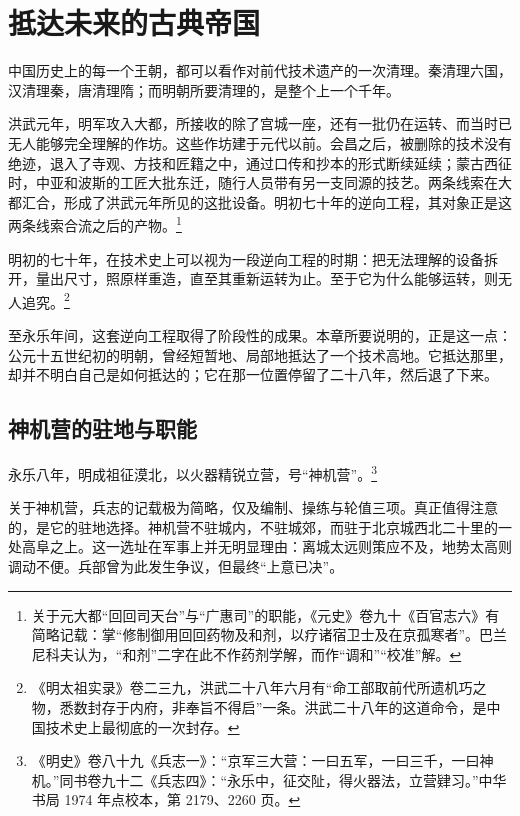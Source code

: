 \chapter{抵达未来的古典帝国}

中国历史上的每一个王朝，都可以看作对前代技术遗产的一次清理。秦清理六国，汉清理秦，唐清理隋；而明朝所要清理的，是整个上一个千年。

洪武元年，明军攻入大都，所接收的除了宫城一座，还有一批仍在运转、而当时已无人能够完全理解的作坊。这些作坊建于元代以前。会昌之后，被删除的技术没有绝迹，退入了寺观、方技和匠籍之中，通过口传和抄本的形式断续延续；蒙古西征时，中亚和波斯的工匠大批东迁，随行人员带有另一支同源的技艺。两条线索在大都汇合，形成了洪武元年所见的这批设备。明初七十年的逆向工程，其对象正是这两条线索合流之后的产物。\footnote{关于元大都“回回司天台”与“广惠司”的职能，《元史》卷九十《百官志六》有简略记载：掌“修制御用回回药物及和剂，以疗诸宿卫士及在京孤寒者”。巴兰尼科夫认为，“和剂”二字在此不作药剂学解，而作“调和”“校准”解。}

明初的七十年，在技术史上可以视为一段逆向工程的时期：把无法理解的设备拆开，量出尺寸，照原样重造，直至其重新运转为止。至于它为什么能够运转，则无人追究。\footnote{《明太祖实录》卷二三九，洪武二十八年六月有“命工部取前代所遗机巧之物，悉数封存于内府，非奉旨不得启”一条。洪武二十八年的这道命令，是中国技术史上最彻底的一次封存。}

至永乐年间，这套逆向工程取得了阶段性的成果。本章所要说明的，正是这一点：公元十五世纪初的明朝，曾经短暂地、局部地抵达了一个技术高地。它抵达那里，却并不明白自己是如何抵达的；它在那一位置停留了二十八年，然后退了下来。

\section{神机营的驻地与职能}

永乐八年，明成祖征漠北，以火器精锐立营，号“神机营”。\footnote{《明史》卷八十九《兵志一》：“京军三大营：一曰五军，一曰三千，一曰神机。”同书卷九十二《兵志四》：“永乐中，征交阯，得火器法，立营肄习。”中华书局 1974 年点校本，第 2179、2260 页。}

关于神机营，兵志的记载极为简略，仅及编制、操练与轮值三项。真正值得注意的，是它的驻地选择。神机营不驻城内，不驻城郊，而驻于北京城西北二十里的一处高阜之上。这一选址在军事上并无明显理由：离城太远则策应不及，地势太高则调动不便。兵部曾为此发生争议，但最终“上意已决”。

